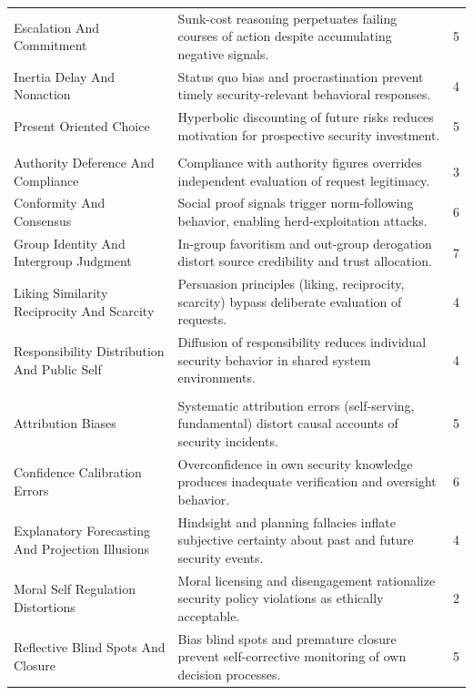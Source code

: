 \begin{longtable}{p{}@{\hspace{20pt}}p{}r}
Escalation And Commitment & Sunk-cost reasoning perpetuates failing courses of action despite accumulating negative signals. & 5 \\
Inertia Delay And Nonaction & Status quo bias and procrastination prevent timely security-relevant behavioral responses. & 4 \\
Present Oriented Choice & Hyperbolic discounting of future risks reduces motivation for prospective security investment. & 5 \\
\addlinespace[2pt]\multicolumn{3}{@{}l}{\textbf{Social \& Authority} ($n_{\mathrm{clusters}}=5$, $n_{\mathrm{biases}}=24$)} \\
Authority Deference And Compliance & Compliance with authority figures overrides independent evaluation of request legitimacy. & 3 \\
Conformity And Consensus & Social proof signals trigger norm-following behavior, enabling herd-exploitation attacks. & 6 \\
Group Identity And Intergroup Judgment & In-group favoritism and out-group derogation distort source credibility and trust allocation. & 7 \\
Liking Similarity Reciprocity And Scarcity & Persuasion principles (liking, reciprocity, scarcity) bypass deliberate evaluation of requests. & 4 \\
Responsibility Distribution And Public Self & Diffusion of responsibility reduces individual security behavior in shared system environments. & 4 \\
\addlinespace[2pt]\multicolumn{3}{@{}l}{\textbf{Self-Assessment} ($n_{\mathrm{clusters}}=5$, $n_{\mathrm{biases}}=22$)} \\
Attribution Biases & Systematic attribution errors (self-serving, fundamental) distort causal accounts of security incidents. & 5 \\
Confidence Calibration Errors & Overconfidence in own security knowledge produces inadequate verification and oversight behavior. & 6 \\
Explanatory Forecasting And Projection Illusions & Hindsight and planning fallacies inflate subjective certainty about past and future security events. & 4 \\
Moral Self Regulation Distortions & Moral licensing and disengagement rationalize security policy violations as ethically acceptable. & 2 \\
Reflective Blind Spots And Closure & Bias blind spots and premature closure prevent self-corrective monitoring of own decision processes. & 5 \\

\end{longtable}
